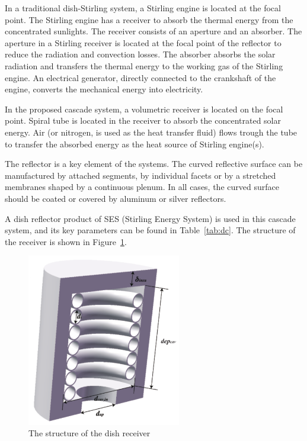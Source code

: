 In a traditional dish-Stirling system, a Stirling engine is located at the focal point. The Stirling engine has a receiver to absorb the thermal energy from the concentrated sunlights. The receiver consists of an aperture and an absorber. The aperture in a Stirling receiver is located at the focal point of the reflector to reduce the radiation and convection losses. The absorber absorbs the solar radiation and transfers the thermal energy to the working gas of the Stirling engine. An electrical generator, directly connected to the crankshaft of the engine, converts the mechanical energy into electricity. 

In the proposed cascade system, a volumetric receiver is located on the focal point. Spiral tube is located in the receiver to absorb the concentrated solar energy. Air (or nitrogen, is used as the heat transfer fluid) flows trough the tube to transfer the absorbed energy as the heat source of Stirling engine(s).

The reflector is a key element of the systems. The curved reflective surface can be manufactured by attached segments, by individual facets or by a stretched membranes shaped by a continuous plenum. In all cases, the curved surface should be coated or covered by aluminum or silver reflectors. 

A dish reflector product of SES (Stirling Energy System) is used in this cascade system, and its key parameters can be found in Table~\ref{tab:dc}. The structure of the receiver is shown in Figure~\ref{fig:dishReceiver}.

\begin{figure}[!ht]
\centering
\includegraphics[width=0.6\textwidth]{fig/DishReceiver.pdf}
\caption{The structure of the dish receiver}\label{fig:dishReceiver}
\end{figure}

